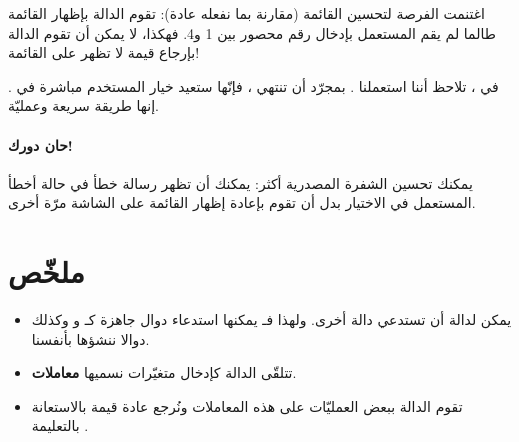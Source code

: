 اغتنمت الفرصة لتحسين القائمة (مقارنة بما نفعله عادة): تقوم الدالة 
بإظهار القائمة طالما لم يقم المستعمل بإدخال رقم محصور بين 1 و4. فهكذا، لا يمكن أن تقوم الدالة بإرجاع قيمة لا تظهر على القائمة!

في ،
تلاحظ أننا استعملنا 
.
بمجرّد أن تنتهي
،
فإنّها ستعيد خيار المستخدم مباشرة في
.
إنها طريقة سريعة وعمليّة.

\paragraph{حان دورك!}
يمكنك تحسين الشفرة المصدرية أكثر: يمكنك أن تظهر رسالة خطأ في حالة أخطأ المستعمل في الاختيار بدل أن تقوم بإعادة إظهار القائمة على الشاشة مرّة أخرى.

\section*{ملخّص}

\begin{itemize}
	\item يمكن لدالة أن تستدعي دالة أخرى. ولهذا فـ
	يمكنها استدعاء دوال جاهزة كـ
	و
 وكذلك دوالا ننشؤها بأنفسنا.
	\item تتلقّى الدالة كإدخال متغيّرات نسميها
	\textbf{معاملات}.
	\item تقوم الدالة ببعض العمليّات على هذه المعاملات ونُرجع عادة قيمة بالاستعانة بالتعليمة
	.
\end{itemize}
